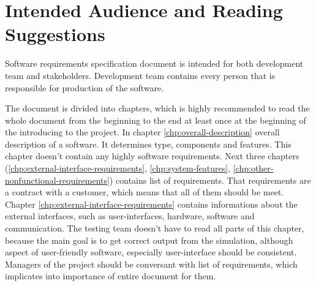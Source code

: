 \section{Intended Audience and Reading Suggestions}
	\begin{comment}
		$<$Describe the different types of reader that the document is intended for, 
		such as developers, project managers, marketing staff, users, testers, and 
		documentation writers. Describe what the rest of this SRS contains and how it is 
		organized. Suggest a sequence for reading the document, beginning with the 
		overview sections and proceeding through the sections that are most pertinent to 
		each reader type.$>$
	\end{comment}
	Software requirements specification document is intended for both development team and stakeholders. Development team contains every person that is responsible for production of the software.
	
	The document is divided into chapters, which is highly recommended to read the whole document from the beginning to the end at least once at the beginning of the introducing to the project. In chapter \ref{chp:overall-description} overall description of a software. It determines type, components and features. This chapter doesn't contain any highly software requirements. Next three chapters (\ref{chp:external-interface-requirements}, \ref{chp:system-features}, \ref{chp:other-nonfunctional-requirements}) contains list of requirements. That requirements are a contract with a customer, which means that all of them should be meet. Chapter \ref{chp:external-interface-requirements} contains informations about the external interfaces, such as user-interfaces, hardware, software and communication. The testing team doesn't have to read all parts of this chapter, because the main goal is to get correct output from the simulation, although aspect of user-friendly software, especially user-interface should be consistent. Managers of the project should be conversant with list of requirements, which implicates into importance of entire document for them. 

